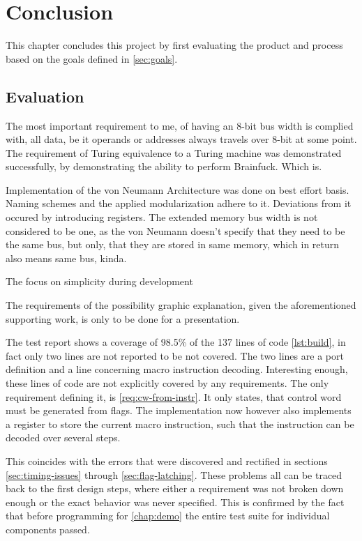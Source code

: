 \chapter{Conclusion} \label{chap:conclusion}
This chapter concludes this project by first evaluating the product and process based on the goals defined in \ref{sec:goals}.

\section{Evaluation}
The most important requirement to me, of having an 8-bit bus width is complied with, all data, be it operands or addresses always travels over 8-bit at some point. The requirement of Turing equivalence to a Turing machine was demonstrated successfully, by demonstrating the ability to perform Brainfuck. Which is. 

Implementation of the von Neumann Architecture was done on best effort basis. Naming schemes and the applied modularization adhere to it. Deviations from it occured by introducing registers. The extended memory bus width is not considered to be one, as the von Neumann doesn't specify that they need to be the same bus, but only, that they are stored in same memory, which in return also means same bus, kinda.

The focus on simplicity during development

The requirements of the possibility graphic explanation, given the aforementioned supporting work, is only to be done for a presentation.


The test report shows a coverage of 98.5\% of the 137 lines of code \ref{lst:build}, in fact only two lines are not reported to be not covered. The two lines are a port definition and a line concerning macro instruction decoding. Interesting enough, these lines of code are not explicitly covered by any requirements. The only requirement defining it, is \ref{req:cw-from-instr}. It only states, that control word must be generated from flags. The implementation now however also implements a register to store the current macro instruction, such that the instruction can be decoded over several steps. 

This coincides with the errors that were discovered and rectified in sections \ref{sec:timing-issues} through \ref{sec:flag-latching}. These problems all can be traced back to the first design steps, where either a requirement was not broken down enough or the exact behavior was never specified. This is confirmed by the fact that before programming for \ref{chap:demo} the entire test suite for individual components passed.


